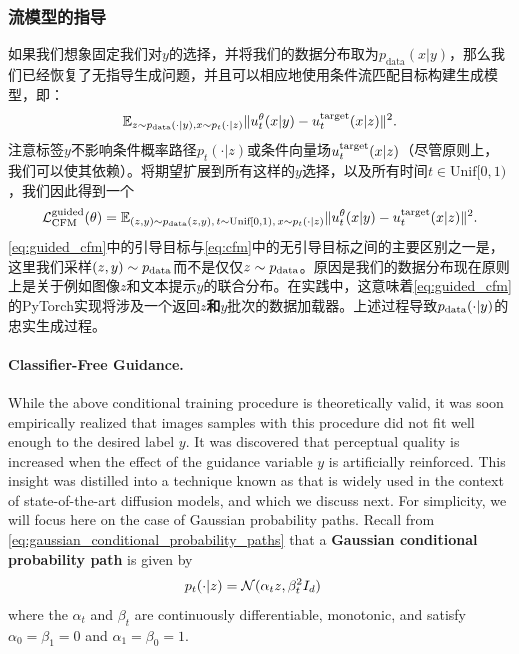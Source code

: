 \subsubsection{流模型的指导}
如果我们想象固定我们对$y$的选择，并将我们的数据分布取为$p_{\text{data}}(x|y)$，那么我们已经恢复了无指导生成问题，并且可以相应地使用条件流匹配目标构建生成模型，即：
\begin{equation}
    \mathbb{E}_{z \sim p_{\text{data}}(\cdot|y), x \sim p_t(\cdot|z)} \lVert u_t^{\theta}(x|y) - u^{\text{target}}_t(x|z)\rVert^2.
\end{equation}
注意标签$y$不影响条件概率路径$p_t(\cdot|z)$或条件向量场$u^{\text{target}}_t(x|z)$（尽管原则上，我们可以使其依赖）。将期望扩展到所有这样的$y$选择，以及所有时间$t \in \text{Unif}[0,1)$，我们因此得到一个
\begin{equation}
    \label{eq:guided_cfm}
    \mathcal{L}_{\text{CFM}}^{\text{guided}}(\theta) = \mathbb{E}_{(z,y) \sim p_{\text{data}}(z,y),\,t\sim \text{Unif}[0,1),\,x\sim p_t(\cdot|z)} \lVert u_t^{\theta}(x|y) - u^{\text{target}}_t(x|z)\rVert^2.
\end{equation}
\cref{eq:guided_cfm}中的引导目标与\cref{eq:cfm}中的无引导目标之间的主要区别之一是，这里我们采样$(z,y) \sim p_{\rm{data}}$而不是仅仅$z \sim p_{\rm{data}}$。原因是我们的数据分布现在原则上是关于例如图像$z$和文本提示$y$的联合分布。在实践中，这意味着\cref{eq:guided_cfm}的PyTorch实现将涉及一个返回\textbf{$z$和$y$}批次的数据加载器。上述过程导致$p_{\rm{data}}(\cdot|y)$的忠实生成过程。


\paragraph{Classifier-Free Guidance.} While the above conditional training procedure is theoretically valid, it was soon empirically realized that images samples with this procedure did not fit well enough to the desired label $y$. It was discovered that perceptual quality is increased when the effect of the guidance variable $y$ is artificially reinforced. This insight was distilled into a technique known as  that is widely used in the context of state-of-the-art diffusion models, and which we discuss next. For simplicity, we will focus here on the case of Gaussian probability paths. Recall from \cref{eq:gaussian_conditional_probability_paths}
 that a \textbf{Gaussian conditional probability path} is given by
\begin{align*}
    p_t(\cdot|z) &= \mathcal{N}(\alpha_t z,\beta_t^2 I_d)
\end{align*}
where the  $\alpha_t$ and $\beta_t$ are continuously differentiable, monotonic, and satisfy $\alpha_0 = \beta_1 = 0$ and $\alpha_1 = \beta_0 = 1$.

